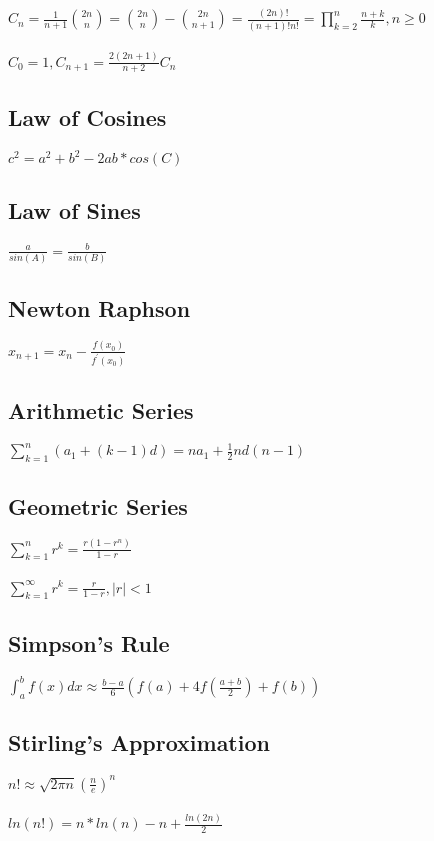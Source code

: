 \documentclass[8pt, oneside]{extarticle}
\begin{document}
\begin{multicols}{3}
$C_n = \frac{1}{n+1}{2n \choose n} = {2n \choose n} - {2n \choose n+1} = \frac{(2n)!}{(n+1)!n!} = \prod_{k=2}^n\frac{n+k}{k}, n \geq 0$\\
\\
$C_0 = 1, C_{n+1} = \frac{2(2n+1)}{n+2}C_n$

\subsection{Law of Cosines}

$c^2 = a^2 + b^2 - 2ab*cos(C)$

\subsection{Law of Sines}

$\frac{a}{sin(A)} = \frac{b}{sin(B)}$

\subsection{Newton Raphson}

$x_{n+1} = x_n - \frac{f(x_0)}{f^\prime(x_0)}$

\subsection{Arithmetic Series}

$\sum_{k=1}^{n} (a_1+(k-1)d) = na_1+\frac{1}{2}nd(n-1)$

\subsection{Geometric Series}

$\sum_{k=1}^nr^k = \frac{r(1-r^n)}{1-r}$\\
\\
$\sum_{k=1}^{\infty} r^k = \frac{r}{1-r}, |r| < 1$

\subsection{Simpson's Rule}

$\int_a^bf(x)dx \approx \frac{b-a}{6}(f(a) + 4f(\frac{a+b}{2}) + f(b))$

\subsection{Stirling's Approximation}

$n! \approx \sqrt{2{\pi}n}(\frac{n}{e})^n$\\
\\
$ln(n!) = n*ln(n) - n + \frac{ln(2n)}{2}$


\end{multicols}
\end{document}
